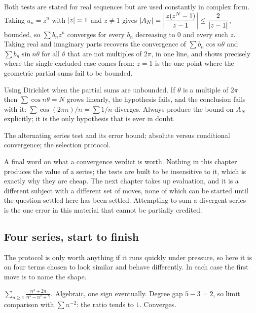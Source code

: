 Both tests are stated for real sequences but are used constantly in complex form. Taking $a_n=z^n$ with $\left\lvert z\right\rvert=1$ and $z\neq1$ gives $\left\lvert A_N\right\rvert=\left|\dfrac{z(z^{N}-1)}{z-1}\right|\leq\dfrac{2}{\left\lvert z-1\right\rvert}$, bounded, so $\sum b_nz^{n}$ converges for every $b_n$ decreasing to $0$ and every such $z$. Taking real and imaginary parts recovers the convergence of $\sum b_n\cos n\theta$ and $\sum b_n\sin n\theta$ for all $\theta$ that are not multiples of $2\pi$, in one line, and shows precisely where the single excluded case comes from: $z=1$ is the one point where the geometric partial sums fail to be bounded.

\begin{trap}
Using Dirichlet when the partial sums are unbounded. If $\theta$ is a multiple of $2\pi$ then $\sum\cos n\theta=N$ grows linearly, the hypothesis fails, and the conclusion fails with it: $\sum\cos(2\pi n)/n=\sum1/n$ diverges. Always produce the bound on $A_N$ explicitly; it is the only hypothesis that is ever in doubt.
\end{trap}

\begin{seealsob}The alternating series test and its error bound; absolute versus conditional convergence; the selection protocol.\end{seealsob}

A final word on what a convergence verdict is worth. Nothing in this chapter produces the value of a series; the tests are built to be insensitive to it, which is exactly why they are cheap. The next chapter takes up evaluation, and it is a different subject with a different set of moves, none of which can be started until the question settled here has been settled. Attempting to sum a divergent series is the one error in this material that cannot be partially credited.

\subsection{Four series, start to finish}

The protocol is only worth anything if it runs quickly under pressure, so here it is on four terms chosen to look similar and behave differently. In each case the first move is to name the shape.

$\displaystyle\sum_{n\geq1}\frac{n^{3}+2n}{n^{5}-n^{2}+7}$. Algebraic, one sign eventually. Degree gap $5-3=2$, so limit comparison with $\sum n^{-2}$: the ratio tends to $1$. Converges.

